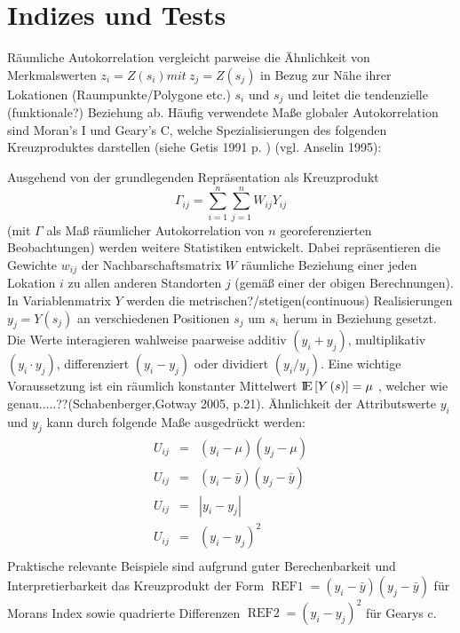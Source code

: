 \section{Indizes und Tests}
Räumliche Autokorrelation vergleicht parweise die Ähnlichkeit von Merkmalswerten 
$z_i=Z\left(s_i\right) mit ~ z_j=Z\left(s_j\right)$ 
in Bezug zur Nähe ihrer Lokationen (Raumpunkte/Polygone etc.) $s_i$ und $s_j$ und leitet die tendenzielle 
(funktionale?) Beziehung ab. 
Häufig verwendete Maße globaler Autokorrelation sind Moran’s I und Geary’s C, welche Spezialisierungen des folgenden 
Kreuzproduktes darstellen (siehe Getis 1991 p.  ) (vgl. Anselin 1995):

Ausgehend von der grundlegenden Repräsentation als Kreuzprodukt 
\begin{equation}
    \Gamma_{ij} =\sum_{i=1}^n \sum_{j=1}^n W_{ij} Y_{ij}
\end{equation}
(mit $\Gamma$ als Maß räumlicher Autokorrelation von $n$ georeferenzierten Beobachtungen) werden weitere Statistiken entwickelt. 
Dabei repräsentieren die Gewichte $w_{ij}$ der Nachbarschaftsmatrix $W$ räumliche Beziehung einer 
jeden Lokation $i$ zu allen anderen Standorten $j$ (gemäß einer der obigen Berechnungen). 
In Variablenmatrix $Y$ werden die metrischen?/stetigen(continuous) Realisierungen $y_j=Y\left( s_j \right) $
an verschiedenen Positionen $s_j$ um $s_i$ herum in Beziehung gesetzt. 
Die Werte interagieren wahlweise paarweise additiv $\left(y_i+y_j\right)$, multiplikativ $\left(y_i \cdot y_j\right)$, 
differenziert $\left(y_i-y_j\right)$ oder dividiert $\left(y_i / y_j\right)$. 
Eine wichtige Voraussetzung ist ein räumlich konstanter Mittelwert $ {\rm I\!E}\left[Y\left(s\right)\right]=\mu$ ,
welcher wie genau.....??(Schabenberger,Gotway 2005, p.21). 
Ähnlichkeit der Attributswerte $y_i$ und $y_j$ kann durch folgende Maße ausgedrückt werden:
\begin{eqnarray*}
    U_{ij} & = &\left (y_i - \mu \right) \left( y_j-\mu \right) \\
    U_{ij} & = &\left( y_i-\bar{y} \right) \left( y_j-\bar{y} \right) \\
    U_{ij} & = &\left| y_i-y_j \right| \\
    U_{ij} & = &\left( y_i-y_j \right)^2 \\
\end{eqnarray*}
Praktische relevante Beispiele sind aufgrund guter Berechenbarkeit und Interpretierbarkeit 
das Kreuzprodukt der Form $\operatorname{REF1}=\left( y_i-\bar{y} \right) \left( y_j-\bar{y} \right)$ für Morans Index 
sowie quadrierte Differenzen $\operatorname{REF2}=\left( y_i-y_j \right)^2$ für Gearys c. 
